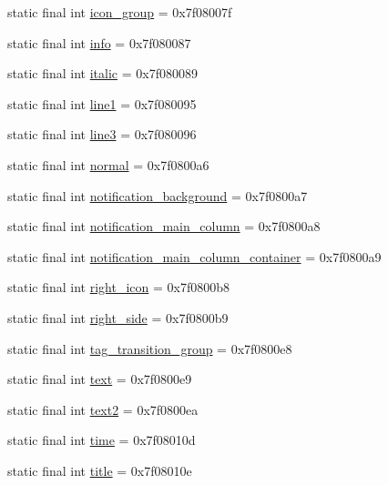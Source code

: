 \begin{DoxyCompactItemize}
static final int \mbox{\hyperlink{classandroid_1_1support_1_1compat_1_1_r_1_1id_ab7518ceedb40a91c3b51aa967e4d6080}{icon\+\_\+group}} = 0x7f08007f
\item 
static final int \mbox{\hyperlink{classandroid_1_1support_1_1compat_1_1_r_1_1id_aba9a6330cdd716b1197d4e2dff77b8cc}{info}} = 0x7f080087
\item 
static final int \mbox{\hyperlink{classandroid_1_1support_1_1compat_1_1_r_1_1id_a121c693689b98271e68bd7d24f21873c}{italic}} = 0x7f080089
\item 
static final int \mbox{\hyperlink{classandroid_1_1support_1_1compat_1_1_r_1_1id_ac5f96e43158f2756f9fc5165b7b7d987}{line1}} = 0x7f080095
\item 
static final int \mbox{\hyperlink{classandroid_1_1support_1_1compat_1_1_r_1_1id_aecfcf837fde543ad55e8ce81157cfe29}{line3}} = 0x7f080096
\item 
static final int \mbox{\hyperlink{classandroid_1_1support_1_1compat_1_1_r_1_1id_a65c33f5c2190f8ca54d7c6ad8dc97aca}{normal}} = 0x7f0800a6
\item 
static final int \mbox{\hyperlink{classandroid_1_1support_1_1compat_1_1_r_1_1id_a188296acd11bfd9ef77df736bb6891a6}{notification\+\_\+background}} = 0x7f0800a7
\item 
static final int \mbox{\hyperlink{classandroid_1_1support_1_1compat_1_1_r_1_1id_ae8e8ad179b7f5ae9da1f77bf0b8eeb7c}{notification\+\_\+main\+\_\+column}} = 0x7f0800a8
\item 
static final int \mbox{\hyperlink{classandroid_1_1support_1_1compat_1_1_r_1_1id_a7066e94509a510ef1b402ba47de5616b}{notification\+\_\+main\+\_\+column\+\_\+container}} = 0x7f0800a9
\item 
static final int \mbox{\hyperlink{classandroid_1_1support_1_1compat_1_1_r_1_1id_a396b266b51c52c0f16da9cf86d84d376}{right\+\_\+icon}} = 0x7f0800b8
\item 
static final int \mbox{\hyperlink{classandroid_1_1support_1_1compat_1_1_r_1_1id_a49a4d81eee0abbdc92ed7ab14bf629bb}{right\+\_\+side}} = 0x7f0800b9
\item 
static final int \mbox{\hyperlink{classandroid_1_1support_1_1compat_1_1_r_1_1id_a61bed857fa277142248305f44d3f9180}{tag\+\_\+transition\+\_\+group}} = 0x7f0800e8
\item 
static final int \mbox{\hyperlink{classandroid_1_1support_1_1compat_1_1_r_1_1id_a3a8294276a843c8ecf9d1de55c381379}{text}} = 0x7f0800e9
\item 
static final int \mbox{\hyperlink{classandroid_1_1support_1_1compat_1_1_r_1_1id_a0b3bf5562d8100ff478806cbbad4d21d}{text2}} = 0x7f0800ea
\item 
static final int \mbox{\hyperlink{classandroid_1_1support_1_1compat_1_1_r_1_1id_a49cf2219fd53fac400ba97ac46a60f87}{time}} = 0x7f08010d
\item 
static final int \mbox{\hyperlink{classandroid_1_1support_1_1compat_1_1_r_1_1id_a40ae774b3537286b4a997e8cbb09e476}{title}} = 0x7f08010e
\end{DoxyCompactItemize}
